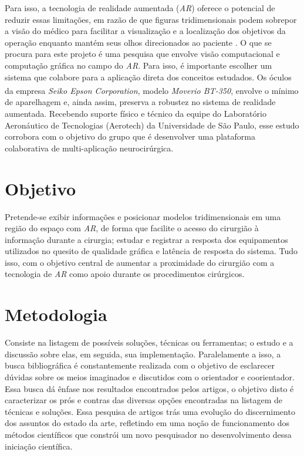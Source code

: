 Para isso, a tecnologia de realidade aumentada (\textit{AR}) oferece o potencial de reduzir essas limitações, em razão de que figuras tridimensionais podem sobrepor a visão do médico para facilitar a visualização e a localização dos objetivos da operação enquanto mantém seus olhos direcionados ao paciente \cite{enhancedvision}. O que se procura para este projeto é uma pesquisa que envolve visão computacional e computação gráfica no campo do \textit{AR}. Para isso, é importante escolher um sistema que colabore para a aplicação direta dos conceitos estudados. Os óculos da empresa \textit{Seiko Epson Corporation\textsuperscript{\textregistered}}, modelo \textit{Moverio BT-350\texttrademark}, envolve o mínimo de aparelhagem e, ainda assim, preserva a robustez no sistema de realidade aumentada. Recebendo suporte físico e técnico da equipe do Laboratório Aeronáutico de Tecnologias (Aerotech) da Universidade de São Paulo, esse estudo corrobora com o objetivo do grupo que é desenvolver uma plataforma colaborativa de multi-aplicação neurocirúrgica. 

\section{Objetivo}

Pretende-se exibir informações e posicionar modelos tridimensionais em uma região do espaço com \textit{AR}, de forma que facilite o acesso do cirurgião à informação durante a cirurgia; estudar e registrar a resposta dos equipamentos utilizados no quesito de qualidade gráfica e latência de resposta do sistema. Tudo isso, com o objetivo central de aumentar a proximidade do cirurgião com a tecnologia de \textit{AR} como apoio durante os procedimentos cirúrgicos.

\section{Metodologia}

Consiste na listagem de possíveis soluções, técnicas ou ferramentas; o estudo e a discussão sobre elas, em seguida, sua implementação. Paralelamente a isso, a busca bibliográfica é constantemente realizada com o objetivo de esclarecer dúvidas sobre os meios imaginados e discutidos com o orientador e coorientador. Essa busca dá ênfase nos resultados encontrados pelos artigos, o objetivo disto é caracterizar os prós e contras das diversas opções encontradas na listagem de técnicas e soluções. Essa pesquisa de artigos trás uma evolução do discernimento dos assuntos do estado da arte, refletindo em uma noção de funcionamento dos métodos científicos que constrói um novo pesquisador no desenvolvimento dessa iniciação científica.

